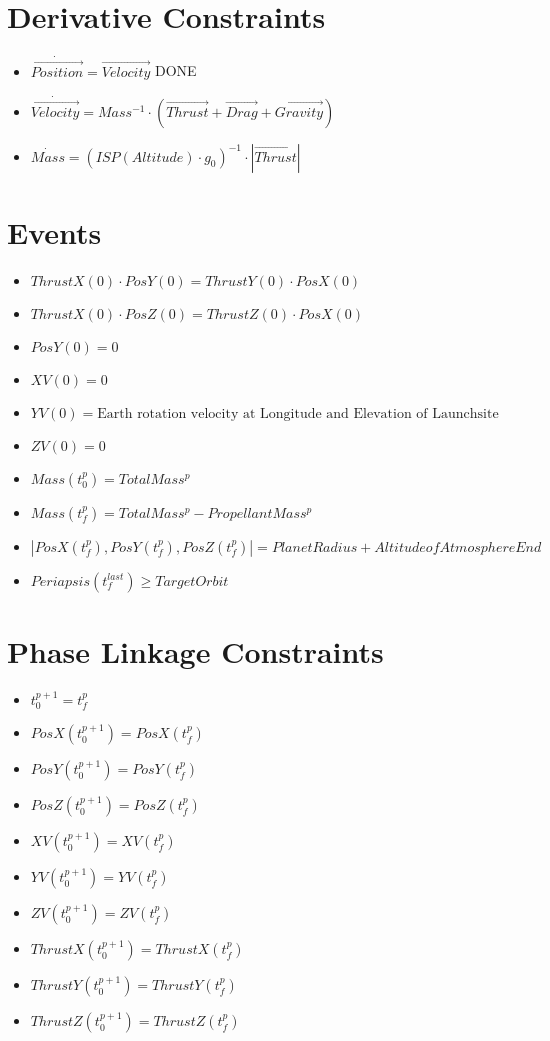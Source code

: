 \documentclass[11pt]{report}
\newcommand{\DONE}{{DONE}}
\begin{document}
\section{Derivative Constraints}

\begin{itemize}
\item $\dot{\overrightarrow{Position}} = \overrightarrow{Velocity}$ \DONE
\item $\dot{\overrightarrow{Velocity}} = Mass^{-1}\cdot\left(\overrightarrow{Thrust} + \overrightarrow{Drag} + \overrightarrow{Gravity}\right)$
\item $\dot{Mass} = (ISP(Altitude) \cdot g_0)^{-1}\cdot\left|\overrightarrow{Thrust}\right|$
\end{itemize}
\section{Events}

\begin{itemize}
\item $ThrustX(0) \cdot PosY(0) = ThrustY(0) \cdot PosX(0)$
\item $ThrustX(0) \cdot PosZ(0) = ThrustZ(0) \cdot PosX(0)$
\item $PosY(0) = 0$
\item $XV(0) = 0$
\item $YV(0) = \textrm{Earth rotation velocity at Longitude and Elevation of Launchsite}$
\item $ZV(0) = 0$
\item $Mass(t_0^p) = TotalMass^p$
\item $Mass(t_f^p) = TotalMass^p - PropellantMass^p$
\item $\left|PosX(t_f^p), PosY(t_f^p), PosZ(t_f^p)\right| = PlanetRadius + Altitude of Atmosphere End$
\item $Periapsis(t_f^{last}) \geq TargetOrbit$
\end{itemize}

\section{Phase Linkage Constraints}

\begin{itemize}
\item $t_0^{p+1} = t_f^p$
\item $PosX(t_0^{p+1}) = PosX(t_f^p)$
\item $PosY(t_0^{p+1}) = PosY(t_f^p)$
\item $PosZ(t_0^{p+1}) = PosZ(t_f^p)$
\item $XV(t_0^{p+1}) = XV(t_f^p)$
\item $YV(t_0^{p+1}) = YV(t_f^p)$
\item $ZV(t_0^{p+1}) = ZV(t_f^p)$
\item $ThrustX(t_0^{p+1}) = ThrustX(t_f^p)$
\item $ThrustY(t_0^{p+1}) = ThrustY(t_f^p)$
\item $ThrustZ(t_0^{p+1}) = ThrustZ(t_f^p)$
\end{itemize}
\end{document}

